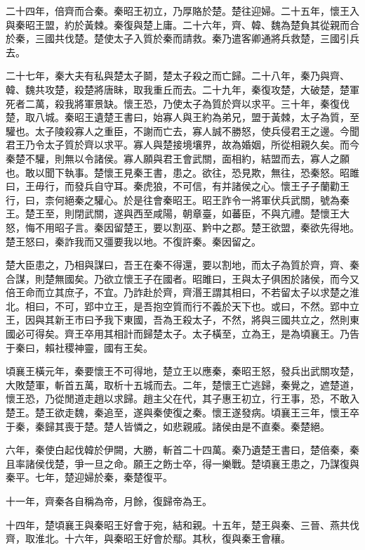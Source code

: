 二十四年，倍齊而合秦。秦昭王初立，乃厚賂於楚。楚往迎婦。二十五年，懷王入與秦昭王盟，約於黃棘。秦復與楚上庸。二十六年，齊、韓、魏為楚負其從親而合於秦，三國共伐楚。楚使太子入質於秦而請救。秦乃遣客卿通將兵救楚，三國引兵去。

二十七年，秦大夫有私與楚太子鬬，楚太子殺之而亡歸。二十八年，秦乃與齊、韓、魏共攻楚，殺楚將唐眛，取我重丘而去。二十九年，秦復攻楚，大破楚，楚軍死者二萬，殺我將軍景缺。懷王恐，乃使太子為質於齊以求平。三十年，秦復伐楚，取八城。秦昭王遺楚王書曰，始寡人與王約為弟兄，盟于黃棘，太子為質，至驩也。太子陵殺寡人之重臣，不謝而亡去，寡人誠不勝怒，使兵侵君王之邊。今聞君王乃令太子質於齊以求平。寡人與楚接境壤界，故為婚姻，所從相親久矣。而今秦楚不驩，則無以令諸侯。寡人願與君王會武關，面相約，結盟而去，寡人之願也。敢以聞下執事。楚懷王見秦王書，患之。欲往，恐見欺，無往，恐秦怒。昭雎曰，王毋行，而發兵自守耳。秦虎狼，不可信，有并諸侯之心。懷王子子蘭勸王行，曰，柰何絕秦之驩心。於是往會秦昭王。昭王詐令一將軍伏兵武關，號為秦王。楚王至，則閉武關，遂與西至咸陽，朝章臺，如蕃臣，不與亢禮。楚懷王大怒，悔不用昭子言。秦因留楚王，要以割巫、黔中之郡。楚王欲盟，秦欲先得地。楚王怒曰，秦詐我而又彊要我以地。不復許秦。秦因留之。

楚大臣患之，乃相與謀曰，吾王在秦不得還，要以割地，而太子為質於齊，齊、秦合謀，則楚無國矣。乃欲立懷王子在國者。昭雎曰，王與太子俱困於諸侯，而今又倍王命而立其庶子，不宜。乃詐赴於齊，齊湣王謂其相曰，不若留太子以求楚之淮北。相曰，不可，郢中立王，是吾抱空質而行不義於天下也。或曰，不然。郢中立王，因與其新王市曰予我下東國，吾為王殺太子，不然，將與三國共立之，然則東國必可得矣。齊王卒用其相計而歸楚太子。太子橫至，立為王，是為頃襄王。乃告于秦曰，賴社稷神靈，國有王矣。

頃襄王橫元年，秦要懷王不可得地，楚立王以應秦，秦昭王怒，發兵出武關攻楚，大敗楚軍，斬首五萬，取析十五城而去。二年，楚懷王亡逃歸，秦覺之，遮楚道，懷王恐，乃從閒道走趙以求歸。趙主父在代，其子惠王初立，行王事，恐，不敢入楚王。楚王欲走魏，秦追至，遂與秦使復之秦。懷王遂發病。頃襄王三年，懷王卒于秦，秦歸其喪于楚。楚人皆憐之，如悲親戚。諸侯由是不直秦。秦楚絕。

六年，秦使白起伐韓於伊闕，大勝，斬首二十四萬。秦乃遺楚王書曰，楚倍秦，秦且率諸侯伐楚，爭一旦之命。願王之飭士卒，得一樂戰。楚頃襄王患之，乃謀復與秦平。七年，楚迎婦於秦，秦楚復平。

十一年，齊秦各自稱為帝，月餘，復歸帝為王。

十四年，楚頃襄王與秦昭王好會于宛，結和親。十五年，楚王與秦、三晉、燕共伐齊，取淮北。十六年，與秦昭王好會於鄢。其秋，復與秦王會穰。

